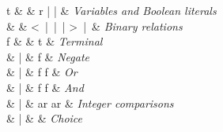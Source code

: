 \begin{syntax}
  t & \Coloneqq{} & r \quad|\quad \tru{} \quad|\quad \fls{}
  & \textit{Variables and Boolean literals} \\
  \otimes & \Coloneqq{} & < \,\;|\;\; \leq \;\:\,|\;\; \geq \,\;|\;\;  > \,\;|\  \equiv & \emph{Binary relations}\\
  [1.5ex]


  f & \Coloneqq{} & t    & \textit{Terminal} \\
  & | & \neg{} f       & \textit{Negate} \\
  & | & f \vee{} f     & \textit{Or} \\
  & | & f \wedge{} f   & \textit{And} \\
  & | & ar \otimes{} ar  & \emph{Integer comparisons} \\
  & | &  & \textit{Choice} \\
\end{syntax}
